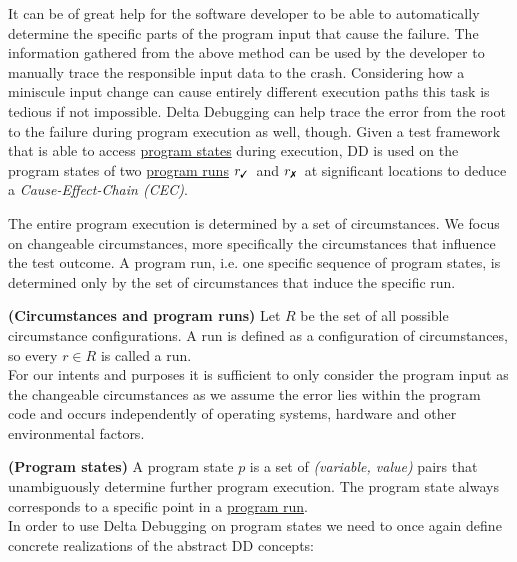 \documentclass[a4paper,UKenglish]{lipics-v2018}
\newcommand{\cmark}{\text{\ding{51}}}
\newcommand{\xmark}{\text{\ding{55}}}
\newcommand{\defsub}[1]{\textbf{(#1)} }
\newcommand{\rpass}[0]{\ensuremath{r_{\cmark}}}
\newcommand{\rfail}[0]{\ensuremath{r_{\xmark}}}
\begin{document}
It can be of great help for the software developer to be able to automatically determine the specific parts of the program input that cause the failure. The information gathered from the above method can be used by the developer to manually trace the responsible input data to the crash. Considering how a miniscule input change can cause entirely different execution paths this task is tedious if not impossible.
Delta Debugging can help trace the error from the root to the failure during program execution as well, though. Given a test framework that is able to access \href{def:program_state}{program states} during execution, DD is used on the program states of two \href{def:program_run}{program runs} \rpass\ and \rfail\ at significant locations to deduce a \textit{Cause-Effect-Chain (CEC)}.

The entire program execution is determined by a set of circumstances. We focus on changeable circumstances, more specifically the circumstances that influence the test outcome. A program run, i.e. one specific sequence of program states, is determined only by the set of circumstances that induce the specific run.

 \label{def:program_run} \defsub{Circumstances and program runs} Let $R$ be the set of all possible circumstance configurations. A run is defined as a configuration of circumstances, so every $r \in R$ is called a run.\\

For our intents and purposes it is sufficient to only consider the program input as the changeable circumstances as we assume the error lies within the program code and occurs independently of operating systems, hardware and other environmental factors.  

 \label{def:program_state} \defsub{Program states} A program state $p$ is a set of \textit{(variable, value)} pairs that unambiguously determine further program execution. The program state always corresponds to a specific point in a \href{def:program_run}{program run}.\\

In order to use Delta Debugging on program states we need to once again define concrete realizations of the abstract DD concepts:
\end{document}
